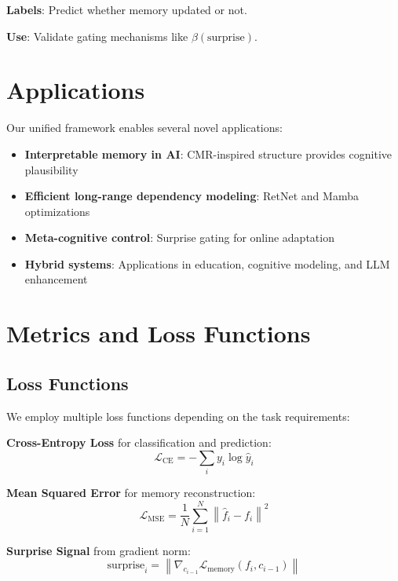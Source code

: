 \documentclass[11pt]{article}
\begin{document}
\textbf{Labels}: Predict whether memory updated or not.

\textbf{Use}: Validate gating mechanisms like $\beta(\text{surprise})$.


\section{Applications}

Our unified framework enables several novel applications:

\begin{itemize}
\item \textbf{Interpretable memory in AI}: CMR-inspired structure provides cognitive plausibility
\item \textbf{Efficient long-range dependency modeling}: RetNet and Mamba optimizations
\item \textbf{Meta-cognitive control}: Surprise gating for online adaptation
\item \textbf{Hybrid systems}: Applications in education, cognitive modeling, and LLM enhancement
\end{itemize}

\section{Metrics and Loss Functions}

\subsection{Loss Functions}

We employ multiple loss functions depending on the task requirements:

\textbf{Cross-Entropy Loss} for classification and prediction:
\begin{equation}
\mathcal{L}_{\text{CE}} = -\sum_{i} y_i \log \hat{y}_i
\end{equation}

\textbf{Mean Squared Error} for memory reconstruction:
\begin{equation}
\mathcal{L}_{\text{MSE}} = \frac{1}{N} \sum_{i=1}^N \left\|\hat{f}_i - f_i\right\|^2
\end{equation}

\textbf{Surprise Signal} from gradient norm:
\begin{equation}
\text{surprise}_i = \left\|\nabla_{c_{i-1}} \mathcal{L}_{\text{memory}}(f_i, c_{i-1})\right\|
\end{equation}
\end{document}
